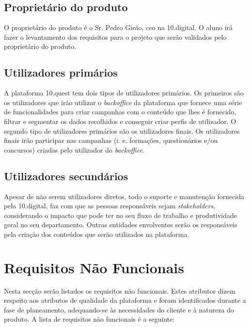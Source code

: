 \subsection{Proprietário do produto}

O proprietário do produto é o Sr. Pedro Girão, \acrshort{ceo} na 10.digital. O aluno irá fazer o levantamento dos requisitos para o projeto que serão validados pelo proprietário do produto.

\subsection{Utilizadores primários}

A plataforma 10.quest tem dois tipos de utilizadores primários. Os primeiros são os utilizadores que irão utilizar o \textit{backoffice} da plataforma que fornece uma série de funcionalidades para criar campanhas com o conteúdo que lhes é fornecido, filtrar e segmentar os dados recolhidos e conseguir criar perfis de utilizador. O segundo tipo de utilizadores primários são os utilizadores finais. Os utilizadores finais irão participar nas campanhas (i. e. formações, questionários e/ou concursos) criadas pelo utilizador do \textit{backoffice}.


\subsection{Utilizadores secundários}

Apesar de não serem utilizadores diretos, todo o suporte e manutenção fornecida pela 10.digital, faz com que as pessoas responsáveis sejam \textit{stakeholders}, considerando o impacto que pode ter no seu fluxo de trabalho e produtividade geral no seu departamento. 
Outras entidades envolventes serão os responsáveis pela criação dos conteúdos que serão utilizados na plataforma.


\section{Requisitos Não Funcionais}
\label{rnf}

Nesta secção serão listados os requisitos não funcionais. Estes atributos dizem respeito aos atributos de qualidade da plataforma e foram identificados durante a fase de planeamento, adequando-se às necessidades do cliente e à natureza do produto. A lista de requisitos não funcionais é a seguinte:

